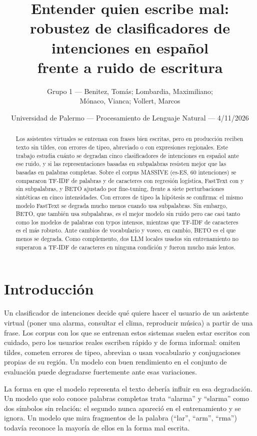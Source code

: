 \documentclass[11pt,a4paper]{article}
\title{Entender quien escribe mal:\\
  robustez de clasificadores de intenciones en español\\
  frente a ruido de escritura}
\author{Grupo 1 --- Benitez, Tomás; Lombardia, Maximiliano;\\
  Mónaco, Vianca; Vollert, Marcos}
\date{Universidad de Palermo --- Procesamiento de Lenguaje Natural --- 4/11/2026}
\begin{document}
\maketitle

\begin{abstract}
Los asistentes virtuales se entrenan con frases bien escritas, pero en producción reciben
texto sin tildes, con errores de tipeo, abreviado o con expresiones regionales. Este trabajo
estudia cuánto se degradan cinco clasificadores de intenciones en español ante ese ruido, y si
las representaciones basadas en subpalabras resisten mejor que las basadas en palabras
completas. Sobre el corpus MASSIVE (es-ES, 60 intenciones) se compararon TF-IDF de palabras y
de caracteres con regresión logística, FastText con y sin subpalabras, y BETO ajustado por
fine-tuning, frente a siete perturbaciones sintéticas en cinco intensidades. Con errores de
tipeo la hipótesis se confirma: el mismo modelo FastText se degrada mucho menos cuando usa
subpalabras. Sin embargo, BETO, que también usa subpalabras, es el mejor modelo sin ruido pero
cae casi tanto como los modelos de palabras con typos intensos, mientras que TF-IDF de
caracteres es el más robusto. Ante cambios de vocabulario y voseo, en cambio, BETO es el que
menos se degrada. Como complemento, dos LLM locales usados sin entrenamiento no superaron a
TF-IDF de caracteres en ninguna condición y fueron mucho más lentos.
\end{abstract}

\section{Introducción}

Un clasificador de intenciones decide qué quiere hacer el usuario de un asistente virtual
(poner una alarma, consultar el clima, reproducir música) a
partir de una frase. Los corpus con los que se entrenan estos sistemas suelen estar escritos
con cuidado, pero los usuarios reales escriben rápido y de forma informal: omiten tildes,
cometen errores de tipeo, abrevian o usan vocabulario y
conjugaciones propias de su región. Un modelo con buen rendimiento en el conjunto de evaluación puede degradarse
fuertemente ante esas variaciones.

La forma en que el modelo representa el texto debería influir en esa degradación. Un modelo que
solo conoce palabras completas trata \enquote{alarma} y \enquote{slarma} como dos símbolos sin
relación: el segundo nunca apareció en el entrenamiento y se ignora. Un modelo que mira
fragmentos de la palabra (\enquote{lar}, \enquote{arm}, \enquote{rma}) todavía reconoce la
mayoría de ellos en la forma mal escrita.
\end{document}
